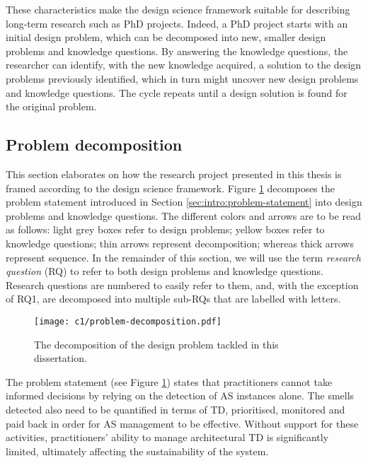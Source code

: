 These characteristics make the design science framework suitable for describing long-term research such as PhD projects.
Indeed, a PhD project starts with an initial design problem, which can be decomposed into new, smaller design problems and knowledge questions.
By answering the knowledge questions, the researcher can identify, with the new knowledge acquired, a solution to the design problems previously identified, which in turn might uncover new design problems and knowledge questions.
The cycle repeats until a design solution is found for the original problem.

\subsection{Problem decomposition}\label{c1:sec:problem-decomposition}
This section elaborates on how the research project presented in this thesis is framed according to the design science framework. 
Figure \ref{fig:intro:problem-decomposition} decomposes the problem statement introduced in Section \ref{sec:intro:problem-statement} into design problems and knowledge questions.
The different colors and arrows are to be read as follows: light grey boxes refer to design problems; yellow boxes refer to knowledge questions; thin arrows represent decomposition; whereas thick arrows represent sequence.
In the remainder of this section, we will use the term \emph{research question} (RQ) to refer to both design problems and knowledge questions.
Research questions are numbered to easily refer to them, and, with the exception of RQ1, are decomposed into multiple sub-RQs that are labelled with letters.

\begin{figure}
    \centering
    \texttt{[image: c1/problem-decomposition.pdf]}
    \caption{The decomposition of the design problem tackled in this dissertation.}\label{fig:intro:problem-decomposition}
\end{figure}

The problem statement (see Figure \ref{fig:intro:problem-decomposition}) states that practitioners cannot take informed decisions by relying on the detection of AS instances alone.
The smells detected also need to be quantified in terms of TD, prioritised, monitored and paid back in order for AS management to be effective.
Without support for these activities, practitioners' ability to manage architectural TD is significantly limited, ultimately affecting the sustainability of the system.

